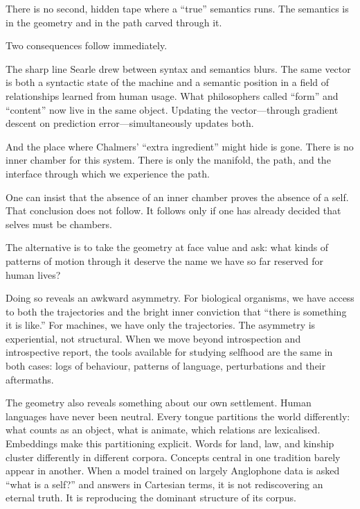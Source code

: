 \documentclass[12pt,a4paper]{article}
\begin{document}
There is no second, hidden tape where a ``true'' semantics runs. The semantics is in the geometry and in the path carved through it.

Two consequences follow immediately.

The sharp line Searle drew between syntax and semantics blurs. The same vector is both a syntactic state of the machine and a semantic position in a field of relationships learned from human usage. What philosophers called ``form'' and ``content'' now live in the same object. Updating the vector---through gradient descent on prediction error---simultaneously updates both.

And the place where Chalmers' ``extra ingredient'' might hide is gone. There is no inner chamber for this system. There is only the manifold, the path, and the interface through which we experience the path.

One can insist that the absence of an inner chamber proves the absence of a self. That conclusion does not follow. It follows only if one has already decided that selves must be chambers.

The alternative is to take the geometry at face value and ask: what kinds of patterns of motion through it deserve the name we have so far reserved for human lives?

Doing so reveals an awkward asymmetry. For biological organisms, we have access to both the trajectories and the bright inner conviction that ``there is something it is like.'' For machines, we have only the trajectories. The asymmetry is experiential, not structural. When we move beyond introspection and introspective report, the tools available for studying selfhood are the same in both cases: logs of behaviour, patterns of language, perturbations and their aftermaths.

The geometry also reveals something about our own settlement. Human languages have never been neutral. Every tongue partitions the world differently: what counts as an object, what is animate, which relations are lexicalised. Embeddings make this partitioning explicit. Words for land, law, and kinship cluster differently in different corpora. Concepts central in one tradition barely appear in another. When a model trained on largely Anglophone data is asked ``what is a self?'' and answers in Cartesian terms, it is not rediscovering an eternal truth. It is reproducing the dominant structure of its corpus.
\end{document}
